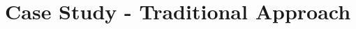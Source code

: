 \documentclass[pdf,aspectratio=169]{beamer}
\begin{document}
\section{Case Study - Traditional Approach}

%
%
\end{document}

